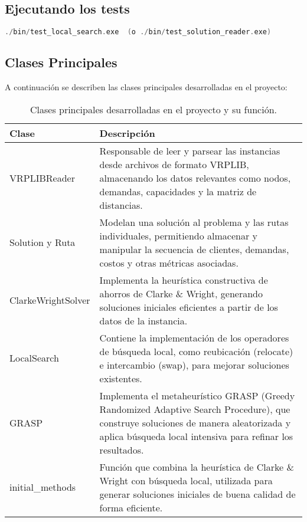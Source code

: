 \documentclass[a4paper,12pt]{article}
\begin{document}
\subsection{Ejecutando los tests}
\begin{lstlisting}[language=C++, basicstyle=\ttfamily\small, keywordstyle=\color{blue}]
    ./bin/test_local_search.exe  (o ./bin/test_solution_reader.exe)
\end{lstlisting}
\newpage
\subsection{Clases Principales}
A continuación se describen las clases principales desarrolladas en el proyecto:

\begin{table}[h!]
\centering
\begin{tabular}{|l|p{10cm}|}
\hline
\textbf{Clase} & \textbf{Descripción} \\
\hline
VRPLIBReader & Responsable de leer y parsear las instancias desde archivos de formato VRPLIB, almacenando los datos relevantes como nodos, demandas, capacidades y la matriz de distancias. \\
\hline
Solution y Ruta & Modelan una solución al problema y las rutas individuales, permitiendo almacenar y manipular la secuencia de clientes, demandas, costos y otras métricas asociadas. \\
\hline
ClarkeWrightSolver & Implementa la heurística constructiva de ahorros de Clarke \& Wright, generando soluciones iniciales eficientes a partir de los datos de la instancia. \\
\hline
LocalSearch & Contiene la implementación de los operadores de búsqueda local, como reubicación (relocate) e intercambio (swap), para mejorar soluciones existentes. \\
\hline
GRASP & Implementa el metaheurístico GRASP (Greedy Randomized Adaptive Search Procedure), que construye soluciones de manera aleatorizada y aplica búsqueda local intensiva para refinar los resultados. \\
\hline
initial\_methods & Función que combina la heurística de Clarke \& Wright con búsqueda local, utilizada para generar soluciones iniciales de buena calidad de forma eficiente. \\
\hline
\end{tabular}
\caption{Clases principales desarrolladas en el proyecto y su función.}
\end{table}
\end{document}
